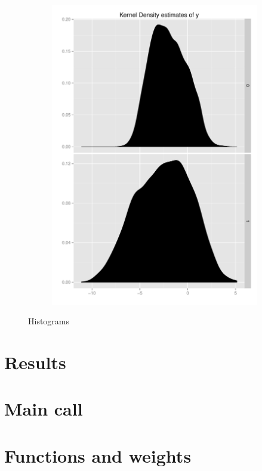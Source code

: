 \documentclass[11pt,letterpaper]{article}
\begin{document}
\begin{figure}[h]
    \begin{subfigure}[b]{0.3\textwidth}\centering \includegraphics[width=1\textwidth]{y} \end{subfigure}    
    \caption{Histograms}		
\end{figure}	



\clearpage
\section{Results}


\section{Main call}


\section{Functions and weights}


\end{document}
